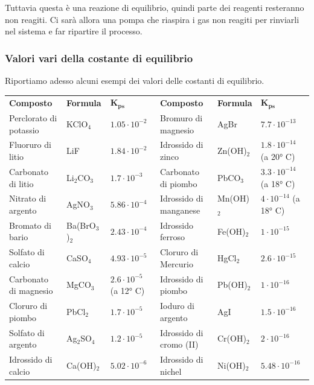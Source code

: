 Tuttavia questa è una reazione di equilibrio, quindi parte dei reagenti resteranno non reagiti. Ci sarà allora una pompa che riaspira i gas non reagiti per rinviarli nel sistema e far ripartire il processo.
\newpage
\subsubsection{Valori vari della costante di equilibrio}

Riportiamo adesso alcuni esempi dei valori delle costanti di equilibrio.

\vspace{0.5cm}\hspace{-0.5cm}\scriptsize\begin{tabular}{p{3.4cm}p{1.6cm}p{2.5cm}p{3.4cm}p{1.6cm}p{2.5cm}}
    \textbf{Composto} & \textbf{Formula} & $\boldsymbol{K_{ps}}$ & \textbf{Composto} & \textbf{Formula} & $\boldsymbol{K_{ps}}$\\[0.7ex]
    Perclorato di potassio & KClO$_4$ & $1.05 \cdot 10^{-2}$ & Bromuro di magnesio & AgBr & $7.7 \cdot 10^{-13}$\\[0.7ex]
    Fluoruro di litio & LiF & $1.84 \cdot 10^{-2}$ & Idrossido di zinco & Zn(OH)$_2$ & $1.8 \cdot 10^{-14}$ (a 20° C)\\[0.7ex]
    Carbonato di litio & Li$_2$CO$_3$ & $1.7 \cdot 10^{-3}$ & Carbonato di piombo & PbCO$_3$ & $3.3 \cdot 10^{-14}$ (a 18° C)\\[0.7ex]
    Nitrato di argento & AgNO$_3$ & $5.86 \cdot 10^{-4}$ & Idrossido di manganese & Mn(OH)$_2$ & $4 \cdot 10^{-14}$ (a 18° C)\\[0.7ex]
    Bromato di bario & Ba(BrO$_3$)$_2$ & $2.43 \cdot 10^{-4}$ & Idrossido ferroso & Fe(OH)$_2$ & $1 \cdot 10^{-15}$ \\[0.7ex]
    Solfato di calcio & CaSO$_4$ & $4.93 \cdot 10^{-5}$ & Cloruro di Mercurio & HgCl$_2$ & $2.6 \cdot 10^{-15}$\\[0.7ex]
    Carbonato di magnesio & MgCO$_3$ & $2.6 \cdot 10^{-5}$ (a 12° C) & Idrossido di piombo & Pb(OH)$_2$ & $1 \cdot 10^{-16}$\\[0.7ex]
    Cloruro di piombo & PbCl$_2$ & $1.7 \cdot 10^{-5}$ & Ioduro di argento & AgI & $1.5 \cdot 10^{-16}$\\[0.7ex]
    Solfato di argento & Ag$_2$SO$_4$ & $1.2 \cdot 10^{-5}$ & Idrossido di cromo (II) & Cr(OH)$_2$ & $2 \cdot 10^{-16}$ \\[0.7ex]
    Idrossido di calcio & Ca(OH)$_2$ & $5.02 \cdot 10^{-6}$ & Idrossido di nichel & Ni(OH)$_2$ & $5.48 \cdot 10^{-16}$ \\[0.7ex]

\end{tabular}
